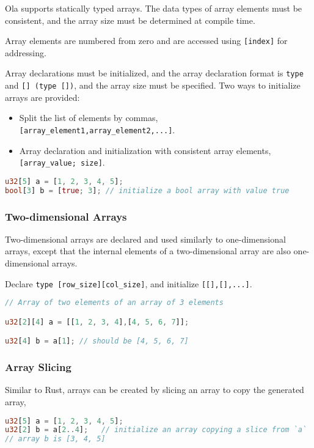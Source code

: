 Ola supports statically typed arrays. The data types of array elements must be consistent, and the array size must be determined at compile time. 

Array elements are numbered from zero and are accessed using \texttt{[index]} for addressing.

Array declarations must be initialized, and the array declaration format is \texttt{type} and \texttt{[] (\texttt{type []})}, and the array size must be specified.
Two ways to initialize arrays are provided:
\begin{itemize}
    \item Split the list of elements by commas, \texttt{[array\_element1,array\_element2,...]}.
    \item Array declaration and initialization with consistent array elements, \texttt{[array\_value; size]}.
\end{itemize}

\begin{lstlisting}[language=rust]
u32[5] a = [1, 2, 3, 4, 5]; 
bool[3] b = [true; 3]; // initialize a bool array with value true
\end{lstlisting}

\subsubsection*{Two-dimensional Arrays}

Two-dimensional arrays are declared and used similarly to one-dimensional arrays, except that the internal elements of a two-dimensional array are also one-dimensional arrays. 

Declare \texttt{type [row\_size][col\_size]}, and initialize \texttt{[[],[],...]}.

\begin{lstlisting}[language=rust]
// Array of two elements of an array of 3 elements

u32[2][4] a = [[1, 2, 3, 4],[4, 5, 6, 7]];

u32[4] b = a[1]; // should be [4, 5, 6, 7]
\end{lstlisting}

\subsubsection*{Array Slicing}

Similar to Rust, arrays can be created by slicing an array to copy the generated array,

\begin{lstlisting}[language=rust]
u32[5] a = [1, 2, 3, 4, 5];
u32[2] b = a[2..4];   // initialize an array copying a slice from `a`
// array b is [3, 4, 5]
\end{lstlisting}

